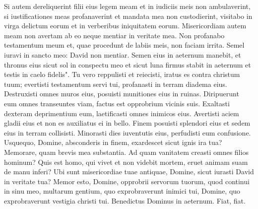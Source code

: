 \begin{biblechapter}
\verse Si autem dereliquerint filii eius legem meam et in iudiciis meis non ambulaverint, 
\verse si iustificationes meas profanaverint et mandata mea non custodierint, 
\verse visitabo in virga delictum eorum et in verberibus iniquitatem eorum. 
\verse Misericordiam autem meam non avertam ab eo neque mentiar in veritate mea. 
\verse Non profanabo testamentum meum et, quae procedunt de labiis meis, non faciam irrita. 
\verse Semel iuravi in sancto meo: David non mentiar. 
\verse Semen eius in aeternum manebit, et thronus eius sicut sol in conspectu meo 
\verse et sicut luna firmus stabit in aeternum et testis in caelo fidelis". 
\verse Tu vero reppulisti et reiecisti, iratus es contra christum tuum; 
\verse evertisti testamentum servi tui, profanasti in terram diadema eius. 
\verse Destruxisti omnes muros eius, posuisti munitiones eius in ruinas. 
\verse Diripuerunt eum omnes transeuntes viam, factus est opprobrium vicinis suis. 
\verse Exaltasti dexteram deprimentium eum, laetificasti omnes inimicos eius. 
\verse Avertisti aciem gladii eius et non es auxiliatus ei in bello. 
\verse Finem posuisti splendori eius et sedem eius in terram collisisti. 
\verse Minorasti dies iuventutis eius, perfudisti eum confusione. 
\verse Usquequo, Domine, absconderis in finem, exardescet sicut ignis ira tua? 
\verse Memorare, quam brevis mea substantia. Ad quam vanitatem creasti omnes filios hominum? 
\verse Quis est homo, qui vivet et non videbit mortem, eruet animam suam de manu inferi? 
\verse Ubi sunt misericordiae tuae antiquae, Domine, sicut iurasti David in veritate tua? 
\verse Memor esto, Domine, opprobrii servorum tuorum, quod continui in sinu meo, multarum gentium, 
\verse quo exprobraverunt inimici tui, Domine, quo exprobraverunt vestigia christi tui. 
\verse Benedictus Dominus in aeternum. Fiat, fiat. 
\end{biblechapter}

\begin{biblechapter}  
\end{biblechapter}

